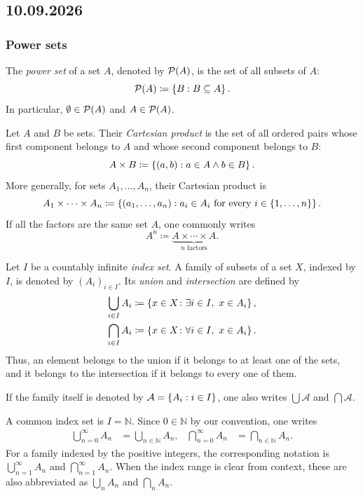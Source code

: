 \documentclass[11pt,a4paper]{amsart}
\begin{document}
\subsection{10.09.2026}

\subsubsection{Power sets}

\begin{definition}
  The \emph{power set} of a set \(A\), denoted by \(\mathcal{P}\!\left(A\right)\), is the set
  of all subsets of \(A\):
  \[
    \mathcal{P}\!\left(A\right) \coloneqq \left\lbrace B : B \subseteq A\right\rbrace.
  \]
  In particular, \(\emptyset \in \mathcal{P}\!\left(A\right)\) and
  \(A \in \mathcal{P}\!\left(A\right)\).
\end{definition}

\begin{definition}
  Let \(A\) and \(B\) be sets. Their \emph{Cartesian product} is the set of all
  ordered pairs whose first component belongs to \(A\) and whose second
  component belongs to \(B\):
  \[
    A \times B \coloneqq \left\lbrace(a,b) : a \in A \land b \in B\right\rbrace.
  \]
  More generally, for sets \(A_1,\ldots,A_n\), their Cartesian product is
  \[
    A_1 \times \cdots \times A_n
    \coloneqq
    \left\lbrace(a_1,\ldots,a_n) : a_i \in A_i
    \text{ for every } i \in \left\lbrace1,\ldots,n\right\rbrace\right\rbrace.
  \]
  If all the factors are the same set \(A\), one commonly writes
  \[
    A^n \coloneqq \underbrace{A \times \cdots \times A}_{n\text{ factors}}.
  \]
\end{definition}

\begin{definition}
  Let \(I\) be a countably infinite \emph{index set}. A family of subsets of a
  set \(X\), indexed by \(I\), is denoted by \((A_i)_{i \in I}\). Its
  \emph{union} and \emph{intersection} are defined by
  \begin{align*}
    \bigcup_{i \in I} A_i
    &\coloneqq \left\lbrace x \in X \colon \exists i \in I,\ x \in A_i\right\rbrace, \\
    \bigcap_{i \in I} A_i
    &\coloneqq \left\lbrace x \in X \colon \forall i \in I,\ x \in A_i\right\rbrace.
  \end{align*}
  Thus, an element belongs to the union if it belongs to at least one of the
  sets, and it belongs to the intersection if it belongs to every one of them.

  If the family itself is denoted by
  \(\mathcal{A} = \left\lbrace A_i : i \in I\right\rbrace\), one also writes
  \(\bigcup \mathcal{A}\) and \(\bigcap \mathcal{A}\).

  A common index set is \(I = \mathbb{N}\). Since \(0 \in \mathbb{N}\) by
  our convention, one writes
  \begin{align*}
    \bigcup_{n=0}^{\infty} A_n
    &= \bigcup_{n \in \mathbb{N}} A_n, &
    \bigcap_{n=0}^{\infty} A_n
    &= \bigcap_{n \in \mathbb{N}} A_n.
  \end{align*}
  For a family indexed by the positive integers, the corresponding notation is
  \(\bigcup_{n=1}^{\infty} A_n\) and
  \(\bigcap_{n=1}^{\infty} A_n\). When the index range is clear from context,
  these are also abbreviated as \(\bigcup_n A_n\) and \(\bigcap_n A_n\).
\end{definition}
\end{document}

